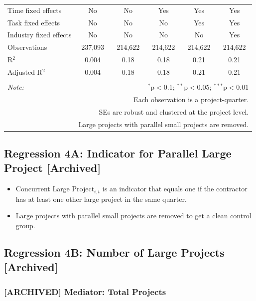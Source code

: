 \documentclass[
]{article}
\providecommand{\tightlist}{%
  \setlength{\itemsep}{0pt}\setlength{\parskip}{0pt}}
\begin{document}
\begin{table}[H]
\begin{tabular}{@{\extracolsep{-2pt}}lccccc}
Time fixed effects & No & No & Yes & Yes & Yes \\ 
Task fixed effects & No & No & No & Yes & Yes \\ 
Industry fixed effects & No & No & No & No & Yes \\ 
Observations & 237,093 & 214,622 & 214,622 & 214,622 & 214,622 \\ 
R$^{2}$ & 0.004 & 0.18 & 0.18 & 0.21 & 0.21 \\ 
Adjusted R$^{2}$ & 0.004 & 0.18 & 0.18 & 0.21 & 0.21 \\ 
\hline 
\hline \\[-1.8ex] 
\textit{Note:}  & \multicolumn{5}{r}{$^{*}$p$<$0.1; $^{**}$p$<$0.05; $^{***}$p$<$0.01} \\ 
 & \multicolumn{5}{r}{Each observation is a project-quarter.} \\ 
 & \multicolumn{5}{r}{SEs are robust and clustered at the project level.} \\ 
 & \multicolumn{5}{r}{Large projects with parallel small projects are removed.} \\ 
\end{tabular} 
\end{table}

\hypertarget{regression-4a-indicator-for-parallel-large-project-archived}{%
\subsection{Regression 4A: Indicator for Parallel Large Project
{[}Archived{]}}\label{regression-4a-indicator-for-parallel-large-project-archived}}

\begin{itemize}
\tightlist
\item
  Concurrent Large Project\(_{i,t}\) is an indicator that equals one if
  the contractor has at least one other large project in the same
  quarter.
\item
  Large projects with parallel small projects are removed to get a clean
  control group.
\end{itemize}

\hypertarget{regression-4b-number-of-large-projects-archived}{%
\subsection{Regression 4B: Number of Large Projects
{[}Archived{]}}\label{regression-4b-number-of-large-projects-archived}}

\hypertarget{archived-mediator-total-projects}{%
\subsubsection{{[}ARCHIVED{]} Mediator: Total
Projects}\label{archived-mediator-total-projects}}
\end{document}

